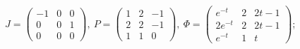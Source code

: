 \begin{enumsolsfull}
		\item \( J = \begin{pmatrix} -1 & 0 & 0 \\ 0 & 0 & 1 \\ 0 & 0 & 0 \end{pmatrix}, ~ P = \begin{pmatrix} 1 & 2 & -1 \\ 2 & 2 & -1 \\ 1 & 1 & 0 \end{pmatrix}, ~ \Phi = \begin{pmatrix} e^{-t} & 2 & 2t - 1 \\ 2e^{-t} & 2 & 2t - 1 \\ e^{-t} & 1 & t \end{pmatrix} \); %

\end{enumsolsfull}

